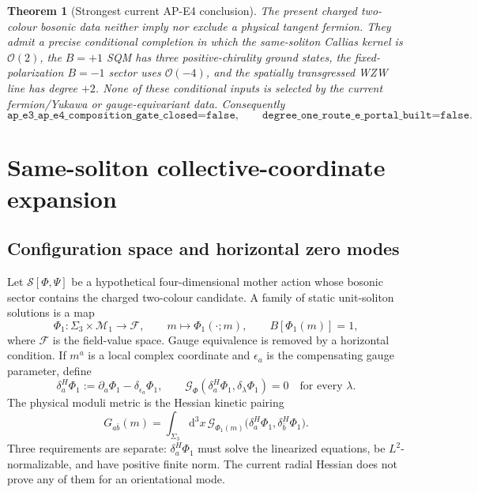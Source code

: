 \documentclass[11pt]{article}
\newtheorem{theorem}{Theorem}[section]
\theoremstyle{definition}
\theoremstyle{remark}
\newcommand{\dd}{\mathrm d}
\newcommand{\cO}{\mathcal O}
\newcommand{\cM}{\mathcal M}
\begin{document}
\begin{theorem}[Strongest current AP-E4 conclusion]
The present charged two-colour bosonic data neither imply nor exclude a
physical tangent fermion.  They admit a precise conditional completion in
which the same-soliton Callias kernel is \(\cO(2)\), the \(B=+1\) SQM has
three positive-chirality ground states, the fixed-polarization \(B=-1\)
sector uses \(\cO(-4)\), and the spatially transgressed WZW line has degree
\(+2\).  None of these conditional inputs is selected by the current
fermion/Yukawa or gauge-equivariant data.  Consequently
\[
 \texttt{ap\_e3\_ap\_e4\_composition\_gate\_closed=false},
 \qquad
 \texttt{degree\_one\_route\_e\_portal\_built=false}.
\]
\end{theorem}

\section{Same-soliton collective-coordinate expansion}

\subsection{Configuration space and horizontal zero modes}

Let \(\mathscr S[\Phi,\Psi]\) be a hypothetical four-dimensional mother
action whose bosonic sector contains the charged two-colour candidate.  A
family of static unit-soliton solutions is a map
\begin{equation}
 \Phi_1:\Sigma_3\times\cM_1\longrightarrow\mathscr F,
 \qquad m\longmapsto\Phi_1(\cdot;m),
 \qquad B[\Phi_1(m)]=1,
 \label{eq:solution-family}
\end{equation}
where \(\mathscr F\) is the field-value space.  Gauge equivalence is removed
by a horizontal condition.  If \(m^a\) is a local complex coordinate and
\(\epsilon_a\) is the compensating gauge parameter, define
\begin{equation}
 \delta_a^H\Phi_1
 :=\partial_a\Phi_1-\delta_{\epsilon_a}\Phi_1,
 \qquad
 \mathscr G_\Phi(\delta_a^H\Phi_1,\delta_\lambda\Phi_1)=0
 \quad\text{for every }\lambda.
 \label{eq:horizontal-mode}
\end{equation}
The physical moduli metric is the Hessian kinetic pairing
\begin{equation}
 G_{a\bar b}(m)
 =\int_{\Sigma_3}\dd^3x\,
 \mathscr G_{\Phi_1(m)}
 \bigl(\delta_a^H\Phi_1,\delta_{\bar b}^H\Phi_1\bigr).
 \label{eq:l2-metric}
\end{equation}
Three requirements are separate: \(\delta_a^H\Phi_1\) must solve the
linearized equations, be \(L^2\)-normalizable, and have positive finite norm.
The current radial Hessian does not prove any of them for an orientational
mode.
\end{document}
